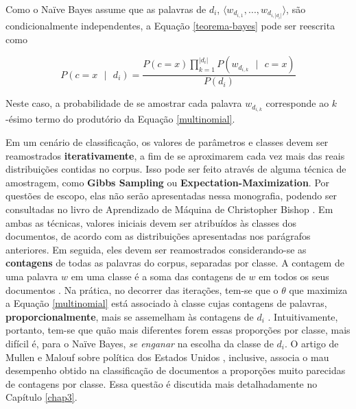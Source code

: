 
Como o Naïve Bayes assume que as palavras de \ensuremath{d_i}, \ensuremath{\langle w_{d_{i,1}}, ..., w_{d_{i,|d_i|}} \rangle}, são condicionalmente independentes, a Equação \ref{teorema-bayes} pode ser reescrita como \cite{naive-forty}

\begin{equation}
\label{teorema-bayes2}
\ensuremath{P(c = x\mbox{ }|\mbox{ }d_i) = \frac{P(c = x)\prod_{k = 1}^{|d_i|}P(w_{d_{i,k}}\mbox{ }|\mbox{ }c = x)}{P(d_i)}}
\end{equation}

Neste caso, a probabilidade de se amostrar cada palavra \ensuremath{w_{d_{i,k}}} corresponde ao \ensuremath{k}-ésimo termo do produtório da Equação \ref{multinomial}.


Em um cenário de classificação, os valores de parâmetros e classes devem ser reamostrados \textbf{iterativamente}, a fim de se aproximarem cada vez mais das reais distribuições contidas no corpus. Isso pode ser feito através de alguma técnica de amostragem, como \textbf{Gibbs Sampling} ou \textbf{Expectation-Maximization}. Por questões de escopo, elas não serão apresentadas nessa monografia, podendo ser consultadas no livro de Aprendizado de Máquina de Christopher Bishop \cite{bishop}. Em ambas as técnicas, valores iniciais devem ser atribuídos às classes dos documentos, de acordo com as distribuições apresentadas nos parágrafos anteriores. Em seguida, eles devem ser reamostrados considerando-se as \textbf{contagens} de todas as palavras do corpus, separadas por classe. A contagem de uma palavra \ensuremath{w} em uma classe é a soma das contagens de \ensuremath{w} em todos os seus documentos \cite{resnik}. Na prática, no decorrer das iterações, tem-se que o \ensuremath{\theta} que maximiza a Equação \ref{multinomial} está associado à classe cujas contagens de palavras, \textbf{proporcionalmente}, mais se assemelham às contagens de \ensuremath{d_i} \cite{resnik}.  Intuitivamente, portanto, tem-se que quão mais diferentes forem essas proporções por classe, mais difícil é, para o Naïve Bayes, \emph{se enganar} na escolha da classe de \ensuremath{d_i}. O artigo de Mullen e Malouf sobre política dos Estados Unidos \cite{aaai-politics}, inclusive, associa o mau desempenho obtido na classificação de documentos a proporções muito parecidas de contagens por classe. Essa questão é discutida mais detalhadamente no Capítulo \ref{chap3}. %


